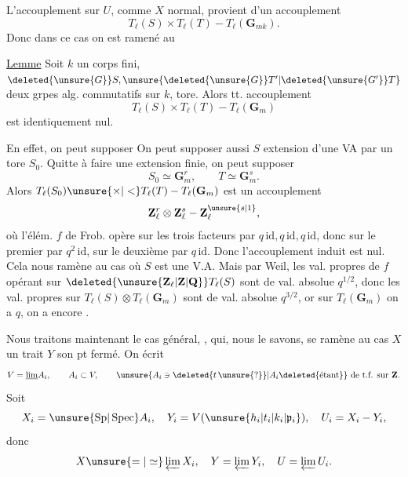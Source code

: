 L'accouplement sur $U$, comme $X$ normal, provient d'un accouplement
\[
T_\ell(S)\times T_\ell(T)\mathbin{-}T_\ell(\mathbf G_{mk}).
\]
Donc dans ce cas on est ramené au

\uline{Lemme} Soit $k$ un corps fini, $\deleted{\unsure{G}}S,\unsure{\deleted{\unsure{G}}T'|\deleted{\unsure{G'}}T}$ deux grpes alg. commutatifs sur $k$,    tore. Alors tt. accouplement
\[
T_\ell(S)\times T_\ell(T)\mathbin{-}T_\ell(\mathbf G_m)
\]
est identiquement nul.

En effet,  on peut supposer  
On peut supposer aussi $S$ extension d'une VA par un tore $S_0$. Quitte à faire une extension finie, on peut supposer
\[
S_0\simeq\mathbf G_m^r,\qquad T\simeq\mathbf G_m^s.
\]
Alors $T_\ell(S_0)\unsure{\times|<}T_\ell(T)\mathbin{-}T_\ell(\mathbf G_m)$ est un accouplement
\[
\mathbf Z_\ell^r\otimes\mathbf Z_\ell^s\mathbin{-}\mathbf Z_\ell^{\unsure{s|1}},
\]
où  l'élém. $f$ de Frob. opère sur  les trois facteurs par $q\,\mathrm{id},q\,\mathrm{id},q\,\mathrm{id}$, donc sur le premier  par $q^2\,\mathrm{id}$, sur le deuxième par $q\,\mathrm{id}$. Donc l'accouplement induit est nul. Cela nous ramène au cas où $S$ est une V.A. Mais par Weil, les val. propres de $f$ opérant sur $\deleted{\unsure{\mathbf Z_\ell|\mathbf Z|\mathbf Q}}T_\ell(S)$ sont de val. absolue $q^{1/2}$, donc les val. propres sur $T_\ell(S)\otimes T_\ell(\mathbf G_m)$ sont de val. absolue $q^{3/2}$, or sur $T_\ell(\mathbf G_m)$ on a $q$, on a encore .

Nous traitons maintenant le cas général, , qui, nous le savons, se ramène au cas $X$ un trait  $Y$ son pt fermé. On écrit
\[
V=\underline{\lim} A_i,\qquad A_i\subset V,\qquad \unsure{A_i\ni\deleted{t\,\unsure{?}}|A_i\deleted{\text{étant}}}\text{ de t.f. sur }\mathbf Z.
\]
 Soit
\[
X_i=\unsure{\mathrm{Sp}|\operatorname{Spec}} A_i,\quad Y_i=V(\unsure{h_i|t_i|k_i|\mathfrak p_i}),\quad U_i=X_i-Y_i,
\]
donc
\[
X\unsure{=|\simeq}\varprojlim X_i,\quad Y=\varprojlim Y_i,\quad U=\varprojlim U_i.
\]

